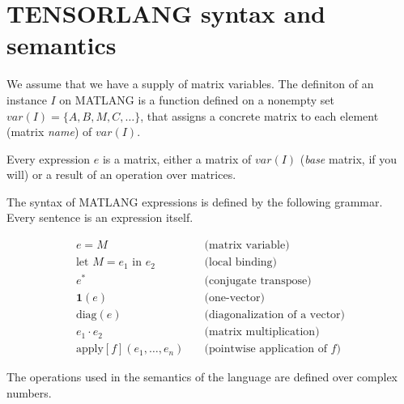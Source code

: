 \section{TENSORLANG syntax and semantics}\label{sec:tensorlang}

We assume that we have a supply of matrix variables. The definiton of an instance $I$ on MATLANG is a function defined on a nonempty set $var(I)=\lbrace A, B, M, C,  \ldots\rbrace$, that assigns a concrete matrix to each element (matrix \textit{name}) of $var(I)$.


Every expression $e$ is a matrix, either a matrix of $var(I)$ (\textit{base} matrix, if you will) or a result of an operation over matrices.
  
The syntax of MATLANG expressions is defined by the following grammar. Every sentence is an expression itself.

\begin{align*}
	e=M\hspace{1em}&\text{(matrix variable)} \\
	\text{let } M=e_1 \text{ in } e_2\hspace{1em}&\text{(local binding)} \\
	e^*\hspace{1em}&\text{(conjugate transpose)} \\
	\mathbf{1}(e)\hspace{1em}&\text{(one-vector)} \\
	\text{diag}(e)\hspace{1em}&\text{(diagonalization of a vector)} \\
	e_1\cdot e_2\hspace{1em}&\text{(matrix multiplication)} \\
	\text{apply}\left[ f \right](e_1, \ldots, e_n)\hspace{1em}&\text{(pointwise application of $f$)}
\end{align*}

The operations used in the semantics of the language are defined over complex numbers.

